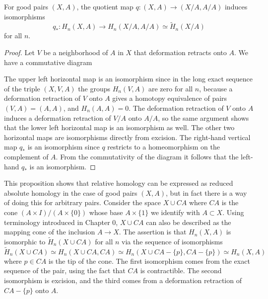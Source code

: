 \begin{proposition}
\label{prop:good-pairs-absolute-homology}
For good pairs $(X, A)$, the quotient map $q:(X,A)\to(X/A, A/A)$ induces isomorphisms
\[q_*:H_n(X,A)\to H_n(X/A, A/A) \simeq \tilde{H}_n(X/A)\]
for all $n$.
\end{proposition}

\begin{proof}
Let $V$ be a neighborhood of $A$ in $X$ that deformation retracts onto $A$. We have a commutative diagram


The upper left horizontal map is an isomorphism since in the long exact sequence of the triple $(X, V, A)$ the groups $H_n(V, A)$ are zero for all $n$, because a deformation retraction of $V$ onto $A$ gives a homotopy equivalence of pairs $(V, A) = (A, A)$, and $H_n(A,A) = 0$. The deformation retraction of $V$ onto $A$ induces a deformation retraction of $V/A$ onto $A/A$, so the same argument shows that the lower left horizontal map is an isomorphism as well. The other two horizontal maps are isomorphisms directly from excision. The right-hand vertical map $q_*$ is an isomorphism since $q$ restricts to a homeomorphism on the complement of $A$. From the commutativity of the diagram it follows that the left-hand $q_*$ is an isomorphism.
\end{proof}
This proposition shows that relative homology can be expressed as reduced absolute homology in the case of good pairs $(X, A)$, but in fact there is a way of doing this for arbitrary pairs. Consider the space $X \cup CA$ where $CA$ is the cone $(A\times I)/(A\times\{0\})$ whose base $A\times\{1\}$ we identify with $A \subset X$. Using terminology introduced in Chapter 0, $X\cup CA$ can also be described as the mapping cone of the inclusion $A \to X$. The assertion is that $H_n(X, A)$ is isomorphic to $\tilde{H}_n(X \cup CA)$ for all $n$ via the sequence of isomorphisms
\[\tilde{H}_n(X \cup CA) \simeq H_n(X \cup CA, CA) \simeq H_n(X \cup CA - \{p\}, CA - \{p\}) \simeq H_n(X, A)\]
where $p \in CA$ is the tip of the cone. The first isomorphism comes from the exact sequence of the pair, using the fact that $CA$ is contractible. The second isomorphism is excision, and the third comes from a deformation retraction of $CA - \{p\}$ onto $A$.

